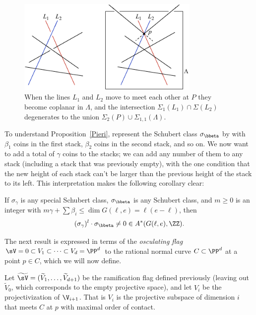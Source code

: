 \begin{figure}[b]
\includegraphics[height=1.8in]{main/Fig12-3}
\caption{When the lines $L_1$ and $L_2$ move to meet each other at $P$
they become coplanar in $\Lambda$,
and the intersection $\Sigma_1(L_1) \cap \Sigma(L_2)$
degenerates to the union $\Sigma_2(P) \cup \Sigma_{1,1}(\Lambda)$.
}
\label{intersection product}
\end{figure}

To understand Proposition~\ref{Pieri}, represent the Schubert class
$\sigma_{\bbeta}$ by 
%
with $\beta_1$ coins in the first
stack, $\beta_2$ coins in the second stack, and so on. We now want to
add a total of $\gamma$ coins to the stacks; we can add any number of
them to any stack (including a stack that was previously empty), with
the one condition that the new height of each stack can't be larger than
the previous height of the stack to its left. This interpretation makes
the following corollary clear:

\begin{corollary}\label{intersection with sigma nonzero}
If $\sigma_\gamma$ is any special Schubert class, $\sigma_{\bbeta}$
is any Schubert class,
and $m\geq 0$ is an integer with $m \gamma + \sum \beta_i \leq \dim
G(\ell, e) = \ell(e-\ell)$, then
$$
(\sigma_\gamma)^l \cdot \sigma_{\bbeta} \neq 0 \in A^*(G(\ell, e), \ZZ).
$$
\end{corollary}

The next result is expressed in terms of the \emph{osculating flag}
$\sV = 0\subset
V_1\subset \cdots \subset V_d = \PP^d$
to the rational normal curve $C\subset \PP^{d}$ at a point $p\in C$, which
we will now define. 

\def\tL{\,\widetilde{\!W\!}\,} %
\def\tsV{{\widetilde \sV}}
\def\tV{{\widetilde V}}

Let $\tsV = (\tV_1, \dots, \tV_{d+1})$ be the 
 ramification flag defined previously (leaving
out $\tV_{0}$, which corresponds to the empty projective space), 
and let $V_{i}$ be the projectivization of $\V_{i+1}$. That is
$V_{i}$ is the projective subspace of dimension $i$ that meets $C$ at $p$
with maximal order of contact.

